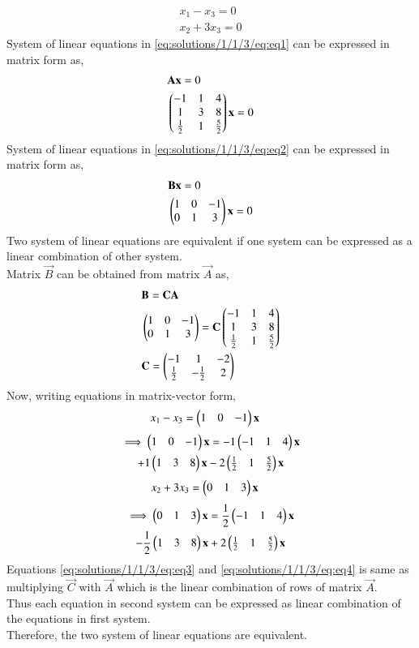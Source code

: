 
\begin{equation} \label{eq:solutions/1/1/3/eq:eq2}
\begin{split}
x_1-x_3=0\\
x_2+3x_3=0
\end{split}
\end{equation}
System of linear equations in \eqref{eq:solutions/1/1/3/eq:eq1} can be expressed in matrix form as,
\begin{align}
    &\mathbf{A}\mathbf{x}=0\\
    &\begin{pmatrix}-1&1&4\\1&3&8\\\frac{1}{2}&1&\frac{5}{2}\end{pmatrix}\mathbf{x}=0
\end{align}
System of linear equations in \eqref{eq:solutions/1/1/3/eq:eq2} can be expressed in matrix form as,
\begin{align}
    &\mathbf{B}\mathbf{x}=0\\
    &\begin{pmatrix}1&0&-1\\0&1&3\end{pmatrix}\mathbf{x}=0
\end{align}
Two system of linear equations are equivalent if one system can be expressed as a linear combination of other system.\\
Matrix $\vec{B}$ can be obtained from matrix $\vec{A}$ as,
\begin{align}
&   \mathbf{B} = \mathbf{C}\mathbf{A}\\
&   \begin{pmatrix}1&0&-1\\0&1&3\end{pmatrix} = \mathbf{C}\begin{pmatrix}-1&1&4\\1&3&8\\\frac{1}{2}&1&\frac{5}{2}\end{pmatrix}\\
& \mathbf{C} = \begin{pmatrix}-1&1&-2\\\frac{1}{2}&-\frac{1}{2}&2\end{pmatrix}
\end{align}
Now, writing equations in matrix-vector form,
\begin{align*}
    &x_1-x_3=\begin{pmatrix}1&0&-1\end{pmatrix}\mathbf{x}
\end{align*}
\begin{multline}
\implies \begin{pmatrix}1&0&-1\end{pmatrix}\mathbf{x} = -1\begin{pmatrix}-1&1&4\end{pmatrix}\mathbf{x}\\+1\begin{pmatrix}1&3&8\end{pmatrix}\mathbf{x}-2\begin{pmatrix}\frac{1}{2}&1&\frac{5}{2}\end{pmatrix}\mathbf{x}\label{eq:solutions/1/1/3/eq:eq3}
\end{multline}
\begin{align*}
    &x_2+3x_3=\begin{pmatrix}0&1&3\end{pmatrix}\mathbf{x}
\end{align*}
\begin{multline}
\implies \begin{pmatrix}0&1&3\end{pmatrix}\mathbf{x} = \frac{1}{2}\begin{pmatrix}-1&1&4\end{pmatrix}\mathbf{x}\\-\frac{1}{2}\begin{pmatrix}1&3&8\end{pmatrix}\mathbf{x}+2\begin{pmatrix}\frac{1}{2}&1&\frac{5}{2}\end{pmatrix}\mathbf{x}\label{eq:solutions/1/1/3/eq:eq4}
\end{multline}
Equations \eqref{eq:solutions/1/1/3/eq:eq3} and \eqref{eq:solutions/1/1/3/eq:eq4} is same as multiplying $\vec{C}$ with $\vec{A}$ which is the linear combination of rows of matrix $\vec{A}$.\\
Thus each equation in second system can be expressed as linear combination of the equations in first system.\\
Therefore, the two system of linear equations are equivalent.
